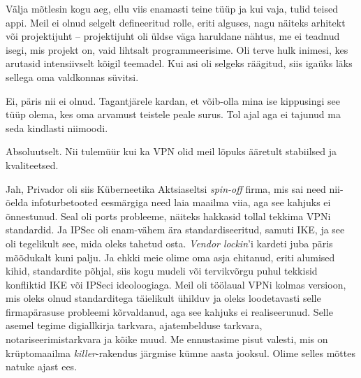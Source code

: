 
Välja mõtlesin kogu aeg, ellu viis enamasti teine tüüp ja kui vaja, tulid teised appi. Meil ei olnud selgelt defineeritud rolle, eriti alguses, nagu näiteks arhitekt või projektijuht -- projektijuht oli üldse väga haruldane 
nähtus, me ei teadnud isegi, mis projekt on, vaid lihtsalt programmeerisime. Oli terve hulk inimesi, kes arutasid 
intensiivselt kõigil teemadel. Kui asi oli selgeks räägitud, siis 
igaüks läks sellega oma valdkonnas süvitsi.


Ei, päris nii ei olnud. Tagantjärele kardan, et võib-olla mina ise 
kippusingi see tüüp olema, kes oma arvamust teistele peale surus. Tol 
ajal aga ei tajunud ma seda kindlasti niimoodi. 


Absoluutselt. Nii tulemüür kui ka VPN olid meil lõpuks 
ääretult stabiilsed ja kvaliteetsed. 

Jah, Privador oli siis Küberneetika Aktsiaseltsi \emph{spin-off} 
firma, mis sai need nii-öelda infoturbetooted eesmärgiga need laia 
maailma viia, aga see kahjuks ei õnnestunud. Seal oli ports 
probleeme, näiteks hakkasid tollal tekkima VPNi
standardid. Ja IPSec oli 
enam-vähem ära standardiseeritud, samuti IKE, ja see oli 
tegelikult see, mida oleks tahetud osta. \emph{Vendor lockin}'i kardeti juba päris 
mõõdukalt kuni palju. Ja ehkki meie olime oma asja ehitanud, eriti 
alumised kihid, standardite põhjal, siis kogu mudeli või tervikvõrgu puhul tekkisid konfliktid IKE või IPSeci ideoloogiaga. Meil oli töölaual VPNi kolmas versioon, mis oleks 
olnud standarditega täielikult ühilduv ja oleks loodetavasti selle firmapärasuse 
probleemi kõrvaldanud, aga see kahjuks ei realiseerunud. 
Selle asemel tegime digiallkirja tarkvara, ajatembelduse tarkvara, 
notariseerimistarkvara ja kõike muud. Me ennustasime pisut valesti, 
mis on krüptomaailma \emph{killer}-rakendus järgmise kümne aasta jooksul. 
Olime selles mõttes natuke ajast ees.

